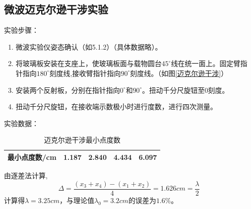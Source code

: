 \documentclass[11pt]{article}
\begin{document}
\subsection{微波迈克尔逊干涉实验}
\noindent 实验步骤：
\begin{enumerate}
    \item 微波实验仪姿态确认（如5.1.2）（具体数据略）。
    \item 将玻璃板安装在支座上，使玻璃板面与载物圆台$45^\circ$线在统一面上。固定臂指针指向$180^\circ$刻度线,接收臂指针指向$90^\circ$刻度线。（如图\ref{迈克尔逊干涉}）
    \item 安装两个反射板，分别在指针指向$0^\circ$和$90^\circ$。扭动千分尺旋钮至0刻度。
    \item 扭动千分尺旋钮，在接收端示数极小时进行度数，进行四次测量。
\end{enumerate}
\noindent 实验数据：
\begin{table}[H]
    \centering
    \caption{迈克尔逊干涉最小点度数}
    \begin{tabularx}{0.6\textwidth}{|c|X|X|X|X|}
    \hline
        最小点度数/cm & 1.187 & 2.840 & 4.434 & 6.097  \\ \hline
    \end{tabularx}
\end{table}
    由逐差法计算,
    \begin{equation}
        \Delta=\frac{(x_3+x_4)-(x_1+x_2)}{4}=1.626cm=\frac{\lambda}{2}
    \end{equation}
    计算得$\lambda=3.25cm$，与理论值$\lambda_0=3.2cm$的误差为$1.6\%$。
\end{document}
